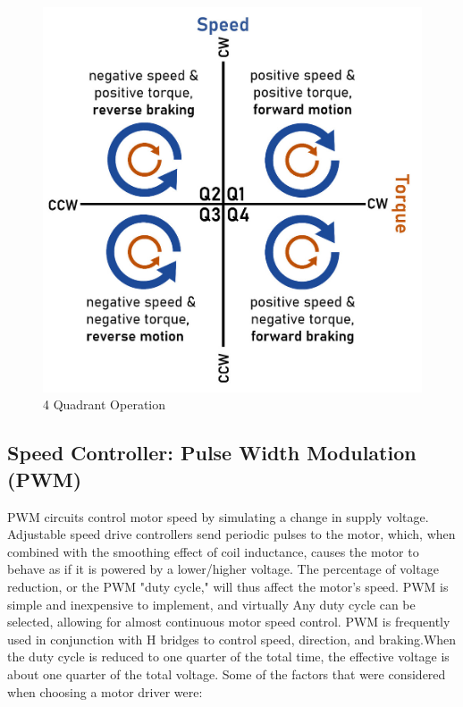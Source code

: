 \begin{figure}[h]
    \centering
    \includegraphics[scale=0.3]{Figures/4Quadrant.jpg}
    \caption[4 Quadrant Operation]{4 Quadrant Operation \cite{noauthor_all_nodate}}
    \label{fig:4quadrantops}
\end{figure}

\subsection{Speed Controller: Pulse Width Modulation (PWM)}

PWM circuits control motor speed by simulating a change in supply voltage. Adjustable speed drive controllers send periodic pulses to the motor, which, when combined with the smoothing effect of coil inductance, causes the motor to behave as if it is powered by a lower/higher voltage. The percentage of voltage reduction, or the PWM "duty cycle," will thus affect the motor's speed. PWM is simple and inexpensive to implement, and virtually Any duty cycle can be selected, allowing for almost continuous motor speed control. PWM is frequently used in conjunction with H bridges to control speed, direction, and braking.When the duty cycle is reduced to one quarter of the total time, the effective voltage is about one quarter of the total voltage.
Some of the factors that were considered when choosing a motor driver were:

